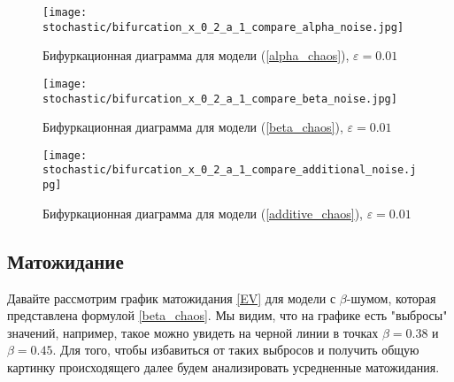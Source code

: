         \begin{figure}
            \centering
            \texttt{[image: stochastic/bifurcation\_x\_0\_2\_a\_1\_compare\_alpha\_noise.jpg]}
        
            \captionsetup{justification=centering}
            \caption{Бифуркационная диаграмма для модели (\ref{alpha_chaos}), \(\varepsilon = 0.01\)}
            \label{bifurcation_x_0_2_a_1_compare_alpha_noise}
        \end{figure}

        \begin{figure}
            \centering
            \texttt{[image: stochastic/bifurcation\_x\_0\_2\_a\_1\_compare\_beta\_noise.jpg]}
        
            \captionsetup{justification=centering}
            \caption{Бифуркационная диаграмма для модели (\ref{beta_chaos}), \(\varepsilon = 0.01\)}
            \label{bifurcation_x_0_2_a_1_compare_beta_noise}
        \end{figure}

        \begin{figure}
            \centering
            \texttt{[image: stochastic/bifurcation\_x\_0\_2\_a\_1\_compare\_additional\_noise.jpg]}
        
            \captionsetup{justification=centering}
            \caption{Бифуркационная диаграмма для модели (\ref{additive_chaos}), \(\varepsilon = 0.01\)}
            \label{bifurcation_x_0_2_a_1_compare_additional_noise}
        \end{figure}

    \subsection{Матожидание}


        Давайте рассмотрим график матожидания \ref{EV} для модели с \(\beta\)-шумом, которая представлена формулой \ref{beta_chaos}. Мы видим, что на графике есть "выбросы" значений, например, такое можно увидеть на черной линии в точках \(\beta = 0.38\) и \(\beta = 0.45\). Для того, чтобы избавиться от таких выбросов и получить общую картинку происходящего далее будем анализировать усредненные матожидания.

        
